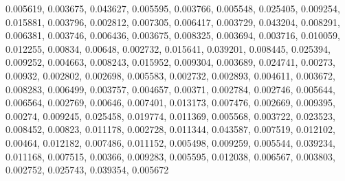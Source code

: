 0.005619, 0.003675, 0.043627, 0.005595, 0.003766, 0.005548, 0.025405, 0.009254, 0.015881, 0.003796, 0.002812, 0.007305, 0.006417, 0.003729, 0.043204, 0.008291, 0.006381, 0.003746, 0.006436, 0.003675, 0.008325, 0.003694, 0.003716, 0.010059, 0.012255, 0.00834, 0.00648, 0.002732, 0.015641, 0.039201, 0.008445, 0.025394, 0.009252, 0.004663, 0.008243, 0.015952, 0.009304, 0.003689, 0.024741, 0.00273, 0.00932, 0.002802, 0.002698, 0.005583, 0.002732, 0.002893, 0.004611, 0.003672, 0.008283, 0.006499, 0.003757, 0.004657, 0.00371, 0.002784, 0.002746, 0.005644, 0.006564, 0.002769, 0.00646, 0.007401, 0.013173, 0.007476, 0.002669, 0.009395, 0.00274, 0.009245, 0.025458, 0.019774, 0.011369, 0.005568, 0.003722, 0.023523, 0.008452, 0.00823, 0.011178, 0.002728, 0.011344, 0.043587, 0.007519, 0.012102, 0.00464, 0.012182, 0.007486, 0.011152, 0.005498, 0.009259, 0.005544, 0.039234, 0.011168, 0.007515, 0.00366, 0.009283, 0.005595, 0.012038, 0.006567, 0.003803, 0.002752, 0.025743, 0.039354, 0.005672
